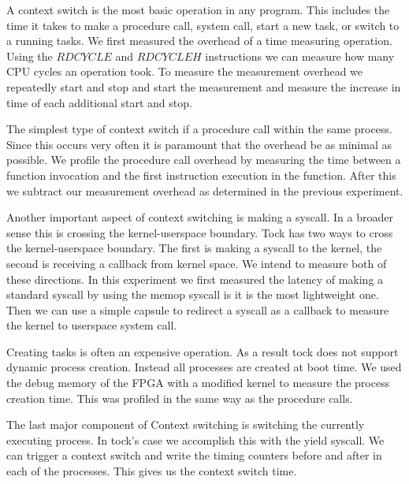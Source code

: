 \documentclass{article}
\begin{document}
A context switch is the most basic operation in any program. This includes the time it takes to make a procedure call, system call, start a new task, or switch to a running tasks. We first measured the overhead of a time measuring operation. Using the $RDCYCLE$ and $RDCYCLEH$ instructions we can measure how many CPU cycles an operation took. To measure the measurement overhead we repeatedly start and stop and start the measurement and measure the increase in time of each additional start and stop.

The simplest type of context switch if a procedure call within the same process. Since this occurs very often it is paramount that the overhead be as minimal as possible. We profile the procedure call overhead by measuring the time between a function invocation and the first instruction execution in the function. After this we subtract our measurement overhead as determined in the previous experiment.

Another important aspect of context switching is making a syscall. In a broader sense this is crossing the kernel-userspace boundary. Tock has two ways to cross the kernel-userspace boundary. The first is making a syscall to the kernel, the second is receiving a callback from kernel space. We intend to measure both of these directions. In this experiment we first measured the latency of making a standard syscall by using the memop syscall is it is the most lightweight one. Then we can use a simple capsule to redirect a syscall as a callback to measure the kernel to userspace system call.

Creating tasks is often an expensive operation. As a result tock does not support dynamic process creation. Instead all processes are created at boot time. We used the debug memory of the FPGA with a modified kernel to measure the process creation time. This was profiled in the same way as the procedure calls.

The last major component of Context switching is switching the currently executing process. In tock's case we accomplish this with the yield syscall. We can trigger a context switch and write the timing counters before and after in each of the processes. This gives us the context switch time.


\end{document}
